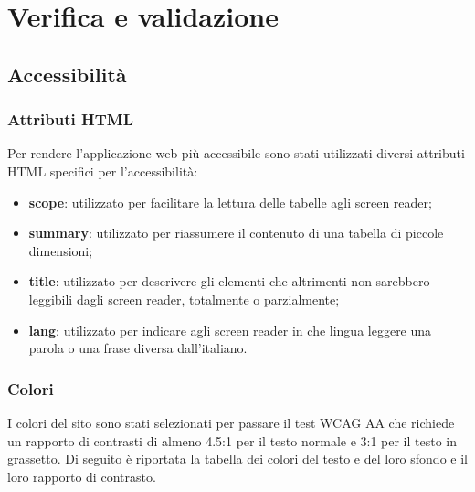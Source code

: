 
\chapter{Verifica e validazione}
\label{cap:verifica-validazione}

\section{Accessibilità}
\subsection{Attributi HTML}

Per rendere l'applicazione web più accessibile sono stati utilizzati diversi attributi HTML specifici per l'accessibilità:
\begin{itemize}
    \item \textbf{scope}: utilizzato per facilitare la lettura delle tabelle agli screen reader;
    \item \textbf{summary}: utilizzato per riassumere il contenuto di una tabella di piccole dimensioni;
    \item \textbf{title}: utilizzato per descrivere gli elementi che altrimenti non sarebbero leggibili dagli screen reader, totalmente o parzialmente;
    \item \textbf{lang}: utilizzato per indicare agli screen reader in che lingua leggere una parola o una frase diversa dall'italiano.
\end{itemize}


\subsection{Colori}
I colori del sito sono stati selezionati per passare il test WCAG AA che richiede un rapporto di contrasti di almeno 4.5:1 per il testo normale e 3:1 per il testo in grassetto. Di seguito è riportata la tabella dei colori del testo e del loro sfondo e il loro rapporto di contrasto.

